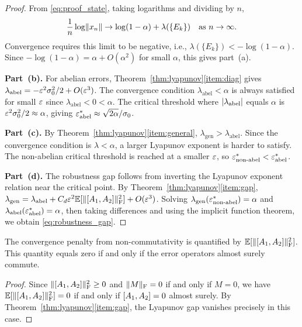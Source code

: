 \begin{proof}
From \eqref{eq:proof_state}, taking logarithms and dividing by $n$,
\begin{equation}\label{eq:lyap_convergence}
  \frac{1}{n}\log\lVert x_n \rVert
  \to \log(1-\alpha) + \lambda(\{E_k\})
  \quad \text{as } n \to \infty.
\end{equation}
Convergence requires this limit to be negative, i.e.,
$\lambda(\{E_k\}) < -\log(1-\alpha)$.  Since $-\log(1-\alpha)
= \alpha + O(\alpha^2)$ for small $\alpha$, this gives part~(a).

\medskip
\noindent\textbf{Part~(b).}
For abelian errors, Theorem~\ref{thm:lyapunov}\ref{item:diag} gives
$\lambda_{\mathrm{abel}} = -\varepsilon^2 \sigma_0^2/2 + O(\varepsilon^3)$.  The
convergence condition $\lambda_{\mathrm{abel}} < \alpha$ is always
satisfied for small $\varepsilon$ since $\lambda_{\mathrm{abel}} < 0 < \alpha$.
The critical threshold where $\lvert \lambda_{\mathrm{abel}} \rvert$ equals
$\alpha$ is $\varepsilon^2 \sigma_0^2/2 \approx \alpha$, giving
$\varepsilon^*_{\mathrm{abel}} \approx \sqrt{2\alpha}/\sigma_0$.

\medskip
\noindent\textbf{Part~(c).}
By Theorem~\ref{thm:lyapunov}\ref{item:general},
$\lambda_{\mathrm{gen}} > \lambda_{\mathrm{abel}}$.  Since the convergence
condition is $\lambda < \alpha$, a larger Lyapunov exponent is harder
to satisfy.  The non-abelian critical threshold is reached at a smaller
$\varepsilon$, so $\varepsilon^*_{\mathrm{non\text{-}abel}} < \varepsilon^*_{\mathrm{abel}}$.

\medskip
\noindent\textbf{Part~(d).}
The robustness gap follows from inverting the Lyapunov exponent
relation near the critical point.  By Theorem~\ref{thm:lyapunov}\ref{item:gap},
$\lambda_{\mathrm{gen}} = \lambda_{\mathrm{abel}}
+ C_d \varepsilon^2 \mathbb{E}[\lVert [A_1, A_2] \rVert_{\mathrm{F}}^2] + O(\varepsilon^3)$.
Solving $\lambda_{\mathrm{gen}}(\varepsilon^*_{\mathrm{non\text{-}abel}}) = \alpha$
and $\lambda_{\mathrm{abel}}(\varepsilon^*_{\mathrm{abel}}) = \alpha$, then
taking differences and using the implicit function theorem, we obtain
\eqref{eq:robustness_gap}.
\end{proof}

\begin{corollary}\label{cor:commutator}
The convergence penalty from non-commutativity is quantified by
$\mathbb{E}[\lVert [A_1, A_2] \rVert_{\mathrm{F}}^2]$.  This quantity equals zero if and
only if the error operators almost surely commute.
\end{corollary}

\begin{proof}
Since $\lVert [A_1, A_2] \rVert_{\mathrm{F}}^2 \ge 0$ and $\lVert M \rVert_{\mathrm{F}} = 0$
if and only if $M = 0$, we have $\mathbb{E}[\lVert [A_1, A_2] \rVert_{\mathrm{F}}^2] = 0$
if and only if $[A_1, A_2] = 0$ almost surely.  By
Theorem~\ref{thm:lyapunov}\ref{item:gap}, the Lyapunov gap vanishes
precisely in this case.
\end{proof}

